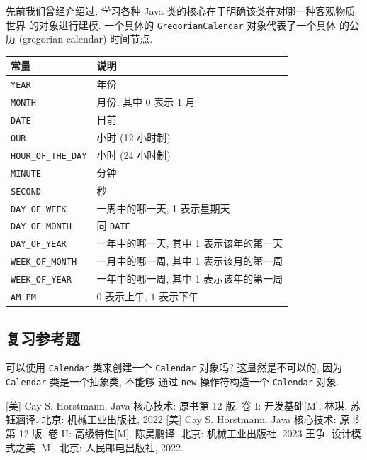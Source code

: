 \documentclass[10pt,UTF8]{book} %
\begin{document}
先前我们曾经介绍过, 学习各种 Java 类的核心在于明确该类在对哪一种客观物质世界
的对象进行建模. 一个具体的 \lstinline|GregorianCalendar| 对象代表了一个具体
的公历 (gregorian calendar) 时间节点.

{ %
\begin{longtable}{p{}p{}}
    \toprule
    \textbf{常量} & \textbf{说明} \\

    \toprule
    \endhead
    \bottomrule
    \endfoot

    \lstinline|YEAR| & 年份 \\ 
    \lstinline|MONTH| & 月份, 其中 $0$ 表示 $1$ 月 \\ 
    \lstinline|DATE| & 日前 \\ 
    \lstinline|OUR| & 小时 (12 小时制) \\ 
    \lstinline|HOUR_OF_THE_DAY| & 小时 (24 小时制) \\ 
    \lstinline|MINUTE| & 分钟 \\ 
    \lstinline|SECOND| & 秒 \\ 
    \lstinline|DAY_OF_WEEK| & 一周中的哪一天, 1 表示星期天 \\ 
    \lstinline|DAY_OF_MONTH| & 同 \lstinline|DATE| \\ 
    \lstinline|DAY_OF_YEAR| & 一年中的哪一天, 其中 1 表示该年的第一天 \\ 
    \lstinline|WEEK_OF_MONTH| & 一月中的哪一周, 其中 1 表示该月的第一周 \\ 
    \lstinline|WEEK_OF_YEAR| & 一年中的哪一周, 其中 1 表示该年的第一周 \\ 
    \lstinline|AM_PM| & $0$ 表示上午, $1$ 表示下午 \\ 
\end{longtable}}

\subsection{复习参考题}

\begin{exercise}
    可以使用 \lstinline|Calendar| 类来创建一个 \lstinline|Calendar| 对象吗?
    这显然是不可以的, 因为 \lstinline|Calendar| 类是一个抽象类, 不能够
    通过 \lstinline|new| 操作符构造一个 \lstinline|Calendar| 对象.
\end{exercise}



\newpage
\begin{thebibliography}{1}
    [美] Cay S. Horstmann. 
    Java 核心技术: 原书第 12 版. 卷 I: 开发基础[M].
    林琪, 苏钰涵译.
    北京: 机械工业出版社, 2022
    [美] Cay S. Horstmann.
    Java 核心技术: 原书第 12 版. 卷 II: 高级特性[M].
    陈昊鹏译.
    北京: 机械工业出版社, 2023
    王争. 设计模式之美 [M]. 北京: 人民邮电出版社, 2022.
\end{thebibliography}


\end{document}
